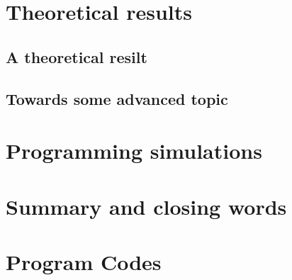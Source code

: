 \documentclass[12pt,a4paper,oneside]{book} %
\begin{document}
	\chapter{Theoretical results} 
	
	\section{A theoretical resilt}
	
	\section{Towards some advanced topic}


	\chapter{Programming simulations} %


		
	\chapter{Summary and closing words}
	



	

	
	
	
	\appendix
	
	\chapter{Program Codes}
	
\end{document}
